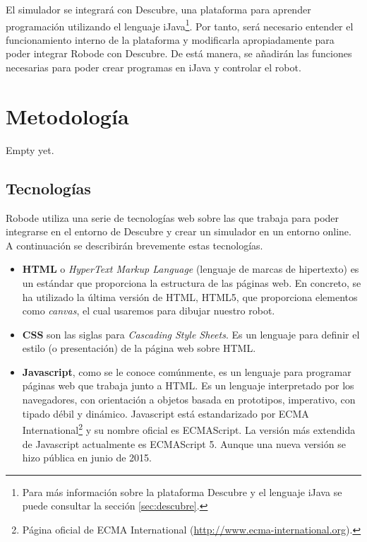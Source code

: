El simulador se integrará con Descubre, una plataforma para aprender programación utilizando el lenguaje iJava\footnote{Para más información sobre la plataforma Descubre y el lenguaje iJava se puede consultar la sección \ref{sec:descubre}.}. Por tanto, será necesario entender el funcionamiento interno de la plataforma y modificarla apropiadamente para poder integrar Robode con Descubre. De está manera, se añadirán las funciones necesarias para poder crear programas en iJava y controlar el robot.


\section{Metodología}
\label{sec:metodologia}


{\color{green}
Empty yet.
}


\subsection{Tecnologías}
\label{sec:tecnologias}


Robode utiliza una serie de tecnologías web sobre las que trabaja para poder integrarse en el entorno de Descubre y crear un simulador en un entorno online. A continuación se describirán brevemente estas tecnologías.

\begin{itemize}
	
	\item \textbf{HTML} o \emph{HyperText Markup Language} (lenguaje de marcas de hipertexto)	es un estándar que proporciona la estructura de las páginas web. En concreto, se ha utilizado la última versión de HTML, HTML5, que proporciona elementos como \emph{canvas}, el cual usaremos para dibujar nuestro robot.
	
	\item \textbf{CSS} son las siglas para \emph{Cascading Style Sheets}. Es un lenguaje para definir el estilo (o presentación) de la página web sobre HTML.
	
	\item \textbf{Javascript}, como se le conoce comúnmente, es un lenguaje para programar páginas web que trabaja junto a HTML. Es un lenguaje interpretado por los navegadores, con orientación a objetos basada en prototipos, imperativo, con tipado débil y dinámico. Javascript está estandarizado por ECMA International\footnote{Página oficial de ECMA International (\url{http://www.ecma-international.org}).} y su nombre oficial es ECMAScript. La versión más extendida de Javascript actualmente es ECMAScript 5. Aunque una nueva versión se hizo pública en junio de 2015\cite{ecmascript6}. 
	
\end{itemize}



